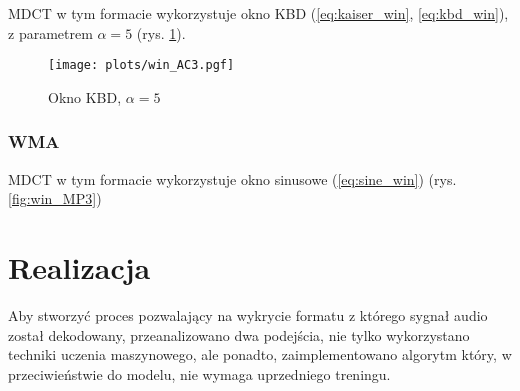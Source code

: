 \documentclass[pl,12pt]{aghdpl}
\let\Oldchapter\chapter%
\renewcommand{\chapter}{\FloatBarrier\Oldchapter}
\let\Oldsubsection\subsection%
\renewcommand{\subsection}{\FloatBarrier\Oldsubsection}
\begin{document}
MDCT w tym formacie wykorzystuje okno KBD (\ref{eq:kaiser_win},
\ref{eq:kbd_win}), z parametrem $\alpha = 5$ (rys. \ref{fig:win_AC3}).
\begin{figure}[!tbh]
  \centering
  \texttt{[image: plots/win\_AC3.pgf]}
  \caption{Okno KBD, $\alpha = 5$}
  \label{fig:win_AC3}
\end{figure}

\subsection{WMA}

MDCT w tym formacie wykorzystuje okno sinusowe (\ref{eq:sine_win})
(rys. \ref{fig:win_MP3})

\chapter{Realizacja}
Aby stworzyć proces pozwalający na wykrycie formatu z którego sygnał audio
został dekodowany, przeanalizowano dwa podejścia, nie tylko wykorzystano
techniki uczenia maszynowego, ale ponadto, zaimplementowano algorytm który, w
przeciwieństwie do modelu, nie wymaga uprzedniego treningu.
\end{document}
